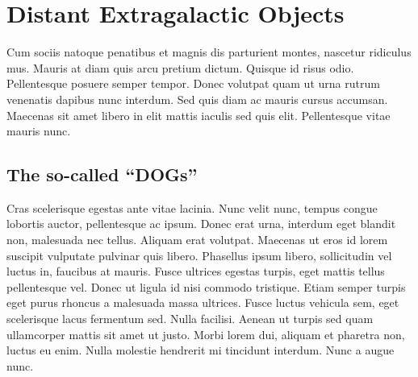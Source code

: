 \documentclass[usenatbib]{mn2e}
\begin{document}
\section{Distant Extragalactic Objects}
Cum sociis natoque penatibus et magnis dis parturient montes, nascetur ridiculus mus. Mauris at diam quis arcu pretium dictum. Quisque id risus odio. Pellentesque posuere semper tempor. Donec volutpat quam ut urna rutrum venenatis dapibus nunc interdum. Sed quis diam ac mauris cursus accumsan. Maecenas sit amet libero in elit mattis iaculis sed quis elit. Pellentesque vitae mauris nunc.

\subsection{The so-called ``DOGs''}
Cras scelerisque egestas ante vitae lacinia. Nunc velit nunc, tempus congue lobortis auctor, pellentesque ac ipsum. Donec erat urna, interdum eget blandit non, malesuada nec tellus. Aliquam erat volutpat. Maecenas ut eros id lorem suscipit vulputate pulvinar quis libero. Phasellus ipsum libero, sollicitudin vel luctus in, faucibus at mauris. Fusce ultrices egestas turpis, eget mattis tellus pellentesque vel. Donec ut ligula id nisi commodo tristique. Etiam semper turpis eget purus rhoncus a malesuada massa ultrices. Fusce luctus vehicula sem, eget scelerisque lacus fermentum sed. Nulla facilisi. Aenean ut turpis sed quam ullamcorper mattis sit amet ut justo. Morbi lorem dui, aliquam et pharetra non, luctus eu enim. Nulla molestie hendrerit mi tincidunt interdum. Nunc a augue nunc.



\end{document}
